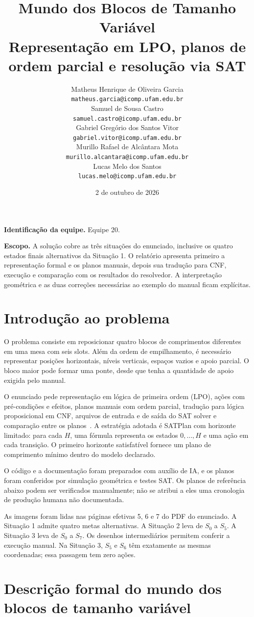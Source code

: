 \documentclass[11pt,a4paper]{article}
\title{\textbf{Mundo dos Blocos de Tamanho Variável}\\[5pt]\large Representação em LPO, planos de ordem parcial e resolução via SAT}
\author{\small Matheus Henrique de Oliveira Garcia\\[-1pt]\small\texttt{matheus.garcia@icomp.ufam.edu.br}\\[4pt]\small Samuel de Sousa Castro\\[-1pt]\small\texttt{samuel.castro@icomp.ufam.edu.br}\\[4pt]\small Gabriel Gregório dos Santos Vitor\\[-1pt]\small\texttt{gabriel.vitor@icomp.ufam.edu.br}\\[4pt]\small Murillo Rafael de Alcântara Mota\\[-1pt]\small\texttt{murillo.alcantara@icomp.ufam.edu.br}\\[4pt]\small Lucas Melo dos Santos\\[-1pt]\small\texttt{lucas.melo@icomp.ufam.edu.br}}
\date{2 de outubro de 2026}
\begin{document}
\maketitle
\thispagestyle{empty}
\textbf{Identificação da equipe.} Equipe 20.

\textbf{Escopo.} A solução cobre as três situações do enunciado, inclusive os quatro estados finais alternativos da Situação 1. O relatório apresenta primeiro a representação formal e os planos manuais, depois sua tradução para CNF, execução e comparação com os resultados do resolvedor. A interpretação geométrica e as duas correções necessárias ao exemplo do manual ficam explícitas.

\newpage
\section{Introdução ao problema}
O problema consiste em reposicionar quatro blocos de comprimentos diferentes em uma mesa com seis slots. Além da ordem de empilhamento, é necessário representar posições horizontais, níveis verticais, espaços vazios e apoio parcial. O bloco maior pode formar uma ponte, desde que tenha a quantidade de apoio exigida pelo manual.

O enunciado pede representação em lógica de primeira ordem (LPO), ações com pré-condições e efeitos, planos manuais com ordem parcial, tradução para lógica proposicional em CNF, arquivos de entrada e de saída do SAT solver e comparação entre os planos~\cite{enunciado}. A estratégia adotada é SATPlan com horizonte limitado: para cada $H$, uma fórmula representa os estados $0,\ldots,H$ e uma ação em cada transição. O primeiro horizonte satisfatível fornece um plano de comprimento mínimo dentro do modelo declarado.

O código e a documentação foram preparados com auxílio de IA, e os planos foram conferidos por simulação geométrica e testes SAT. Os planos de referência abaixo podem ser verificados manualmente; não se atribui a eles uma cronologia de produção humana não documentada.

As imagens foram lidas nas páginas efetivas 5, 6 e 7 do PDF do enunciado. A Situação 1 admite quatro metas alternativas. A Situação 2 leva de $S_0$ a $S_5$. A Situação 3 leva de $S_0$ a $S_7$. Os desenhos intermediários permitem conferir a execução manual. Na Situação 3, $S_5$ e $S_6$ têm exatamente as mesmas coordenadas; essa passagem tem zero ações.

\section{Descrição formal do mundo dos blocos de tamanho variável}
\end{document}
